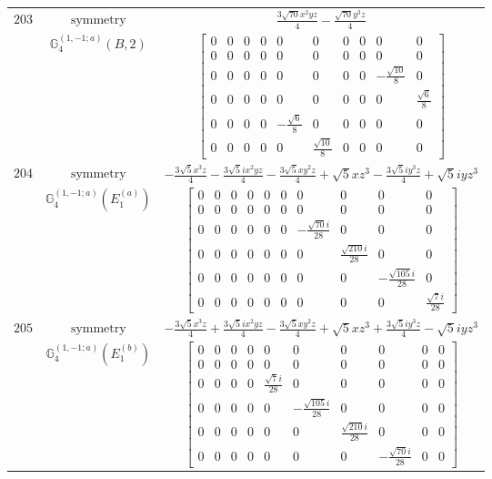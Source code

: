 \documentclass[fleqn,8pt,landscape]{jsarticle}
\begin{document}
\begin{longtable}{ccc}
$ 203 $ & $ \text{symmetry} $ & $ \frac{3 \sqrt{70} x^{2} y z}{4} - \frac{\sqrt{70} y^{3} z}{4} $ \\
$  $ & $ \mathbb{G}_{4}^{(1,-1;a)}(B,2) $ & $ \begin{bmatrix} 0 & 0 & 0 & 0 & 0 & 0 & 0 & 0 & 0 & 0 \\ 0 & 0 & 0 & 0 & 0 & 0 & 0 & 0 & 0 & 0 \\ 0 & 0 & 0 & 0 & 0 & 0 & 0 & 0 & - \frac{\sqrt{10}}{8} & 0 \\ 0 & 0 & 0 & 0 & 0 & 0 & 0 & 0 & 0 & \frac{\sqrt{6}}{8} \\ 0 & 0 & 0 & 0 & - \frac{\sqrt{6}}{8} & 0 & 0 & 0 & 0 & 0 \\ 0 & 0 & 0 & 0 & 0 & \frac{\sqrt{10}}{8} & 0 & 0 & 0 & 0 \end{bmatrix} $ \\ \hline
$ 204 $ & $ \text{symmetry} $ & $ - \frac{3 \sqrt{5} x^{3} z}{4} - \frac{3 \sqrt{5} i x^{2} y z}{4} - \frac{3 \sqrt{5} x y^{2} z}{4} + \sqrt{5} x z^{3} - \frac{3 \sqrt{5} i y^{3} z}{4} + \sqrt{5} i y z^{3} $ \\
$  $ & $ \mathbb{G}_{4}^{(1,-1;a)}(E_{1}^{(a)}) $ & $ \begin{bmatrix} 0 & 0 & 0 & 0 & 0 & 0 & 0 & 0 & 0 & 0 \\ 0 & 0 & 0 & 0 & 0 & 0 & 0 & 0 & 0 & 0 \\ 0 & 0 & 0 & 0 & 0 & 0 & - \frac{\sqrt{70} i}{28} & 0 & 0 & 0 \\ 0 & 0 & 0 & 0 & 0 & 0 & 0 & \frac{\sqrt{210} i}{28} & 0 & 0 \\ 0 & 0 & 0 & 0 & 0 & 0 & 0 & 0 & - \frac{\sqrt{105} i}{28} & 0 \\ 0 & 0 & 0 & 0 & 0 & 0 & 0 & 0 & 0 & \frac{\sqrt{7} i}{28} \end{bmatrix} $ \\ \hline
$ 205 $ & $ \text{symmetry} $ & $ - \frac{3 \sqrt{5} x^{3} z}{4} + \frac{3 \sqrt{5} i x^{2} y z}{4} - \frac{3 \sqrt{5} x y^{2} z}{4} + \sqrt{5} x z^{3} + \frac{3 \sqrt{5} i y^{3} z}{4} - \sqrt{5} i y z^{3} $ \\
$  $ & $ \mathbb{G}_{4}^{(1,-1;a)}(E_{1}^{(b)}) $ & $ \begin{bmatrix} 0 & 0 & 0 & 0 & 0 & 0 & 0 & 0 & 0 & 0 \\ 0 & 0 & 0 & 0 & 0 & 0 & 0 & 0 & 0 & 0 \\ 0 & 0 & 0 & 0 & \frac{\sqrt{7} i}{28} & 0 & 0 & 0 & 0 & 0 \\ 0 & 0 & 0 & 0 & 0 & - \frac{\sqrt{105} i}{28} & 0 & 0 & 0 & 0 \\ 0 & 0 & 0 & 0 & 0 & 0 & \frac{\sqrt{210} i}{28} & 0 & 0 & 0 \\ 0 & 0 & 0 & 0 & 0 & 0 & 0 & - \frac{\sqrt{70} i}{28} & 0 & 0 \end{bmatrix} $ \\ \hline

\end{longtable}
\end{document}
